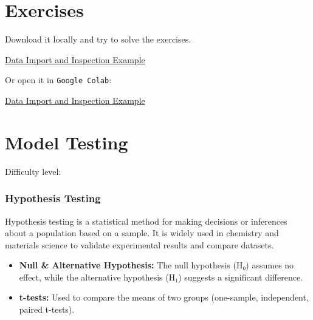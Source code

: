 \documentclass[
  letterpaper,
  DIV=11,
  numbers=noendperiod]{scrreprt}
\begin{document}

\chapter*{Exercises}\label{exercises-4}


Download it locally and try to solve the exercises.

\href{https://github.com/stkroe/PythonforChemists/blob/main/course/examples/SEDA_Example.ipynb}{Data
Import and Inspection Example}

Or open it in \texttt{Google\ Colab}:

\href{https://colab.research.google.com/github/stkroe/PythonforChemists/blob/main/course/examples/SEDA_Example.ipynb}{Data
Import and Inspection Example}

\chapter{Model Testing}\label{model-testing}

Difficulty level: { }

\subsection*{Hypothesis Testing}\label{hypothesis-testing}

Hypothesis testing is a statistical method for making decisions or
inferences about a population based on a sample. It is widely used in
chemistry and materials science to validate experimental results and
compare datasets.

\begin{itemize}
\item
  \textbf{Null \& Alternative Hypothesis:} The null hypothesis (H₀)
  assumes no effect, while the alternative hypothesis (H₁) suggests a
  significant difference.
\item
  \textbf{t-tests:} Used to compare the means of two groups (one-sample,
  independent, paired t-tests).
\end{itemize}
\end{document}
